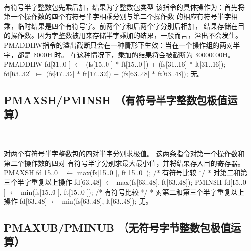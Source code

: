 \begin{instructionblk}
   \\
  {有符号半字整数包先乘后加，结果为字整数包类型}
  {该指令的具体操作为：首先将第一个操作数的四个有符号半字相乘分别与第二个操作数
  的相应有符号半字相乘，临时结果是四个有符号字。前两个字和后两个字分别后相加，
  结果存储在目的操作数。因为字整数被用来存储半字乘加的结果，一般而言，溢出不会发生。
  PMADDHW指令的溢出截断只会在一种情形下生效：当在一个操作组的两对半字，都是 8000H 时。
  在这种情况下，乘加的结果将会被截断为 80000000H。}
  {PMADDHW \narrownewline
  fd[31..0 ] $\leftarrow$ (fs[15..0 ] * ft[15..0 ]) + (fs[31..16] * ft[31..16]); \narrownewline
  fd[63..32] $\leftarrow$ (fs[47..32] * ft[47..32]) + (fs[63..48] * ft[63..48]);}
  {无。}
\end{instructionblk}

\subsection{PMAXSH/PMINSH （有符号半字整数包极值运算）}

\begin{instructionblk}
   \\
   \\
  {对两个有符号半字整数包的四对半字分别求极值。}
  {这两条指令对第一个操作数和第二个操作数的四对
  有符号半字分别求最大最小值，并将结果存入目的寄存器。}
  {PMAXSH \narrownewline
  fd[15..0 ] $\leftarrow$ max(fs[15..0 ], ft[15..0 ]); /* 有符号比较 */ \narrownewline
  * 对第二和第三个半字重复以上操作 \narrownewline
  fd[63..48] $\leftarrow$ max(fs[63..48], ft[63..48]); \narrownewline \narrownewline
  PMINSH \narrownewline
  fd[15..0 ] $\leftarrow$ min(fs[15..0 ], ft[15..0 ]); /* 有符号比较 */ \narrownewline
  * 对第二和第三个半字重复以上操作 \narrownewline
  fd[63..48] $\leftarrow$ min(fs[63..48], ft[63..48]);}
  {无。}
\end{instructionblk}

\subsection{PMAXUB/PMINUB （无符号字节整数包极值运算）}

